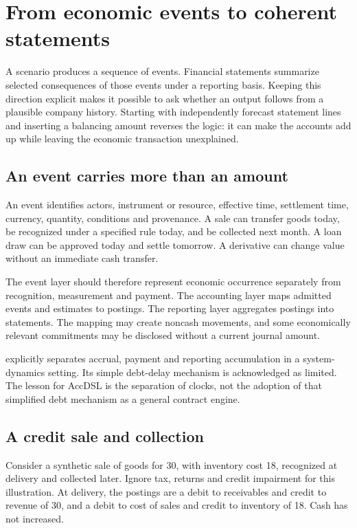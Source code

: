 \chapter[Events and financial statements]{From economic events to coherent statements}
\label{sim:events}

A scenario produces a sequence of events. Financial statements summarize selected consequences of those events under a reporting basis. Keeping this direction explicit makes it possible to ask whether an output follows from a plausible company history. Starting with independently forecast statement lines and inserting a balancing amount reverses the logic: it can make the accounts add up while leaving the economic transaction unexplained.

\section{An event carries more than an amount}
An event identifies actors, instrument or resource, effective time, settlement time, currency, quantity, conditions and provenance. A sale can transfer goods today, be recognized under a specified rule today, and be collected next month. A loan draw can be approved today and settle tomorrow. A derivative can change value without an immediate cash transfer.

The event layer should therefore represent economic occurrence separately from recognition, measurement and payment. The accounting layer maps admitted events and estimates to postings. The reporting layer aggregates postings into statements. The mapping may create noncash movements, and some economically relevant commitments may be disclosed without a current journal amount.

\citet[Sections 3.3--3.5]{pierson2020} explicitly separates accrual, payment and reporting accumulation in a system-dynamics setting. Its simple debt-delay mechanism is acknowledged as limited. The lesson for AccDSL is the separation of clocks, not the adoption of that simplified debt mechanism as a general contract engine.

\section{A credit sale and collection}
Consider a synthetic sale of goods for 30, with inventory cost 18, recognized at delivery and collected later. Ignore tax, returns and credit impairment for this illustration. At delivery, the postings are a debit to receivables and credit to revenue of 30, and a debit to cost of sales and credit to inventory of 18. Cash has not increased.

